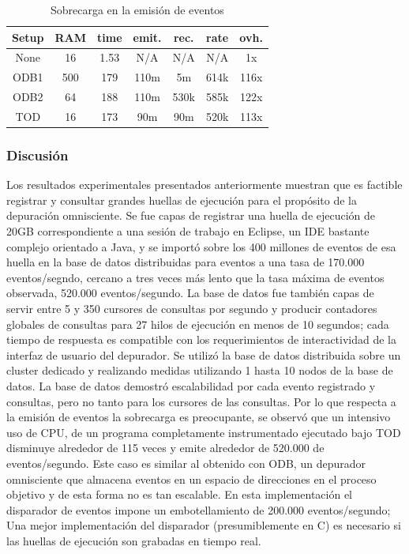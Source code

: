\documentclass[12pt,legalpaper]{report}
\begin{document}
\begin{table}[!h]
\begin{center}
\begin{tabular}{| c | c | c | c | c | c | c |}
\hline
\rowcolor[gray]{0.9}Setup & RAM & time & emit. & rec. & rate & ovh.\\
\hline
None & 16 & 1.53 & N/A & N/A & N/A & 1x\\
\hline
ODB1 & 500 & 179 & 110m & 5m & 614k & 116x\\
\hline
ODB2 & 64 & 188 & 110m & 530k & 585k & 122x\\
\hline
TOD & 16 & 173 & 90m & 90m & 520k & 113x\\
\hline
\end{tabular}
\caption{Sobrecarga en la emisión de eventos}
\label{overheadEvents}
\end{center}
\end{table}

			\subsubsection{Discusión}

Los resultados experimentales presentados anteriormente muestran que es factible registrar y consultar grandes huellas de ejecución para el propósito de la depuración omnisciente.  Se fue capas de registrar una huella de ejecución de 20GB correspondiente a una sesión de trabajo en Eclipse, un IDE bastante complejo orientado a Java, y se importó sobre los 400 millones de eventos de esa huella en la base de datos distribuidas para eventos a una tasa de 170.000 eventos/segndo, cercano a tres veces más lento que la tasa máxima de eventos observada, 520.000 eventos/segundo.  La base de datos fue también capas de servir entre 5 y 350 cursores de consultas por segundo y producir contadores globales de consultas para 27 hilos de ejecución en menos de 10 segundos; cada tiempo de respuesta es compatible con los requerimientos de interactividad de la interfaz de usuario del depurador.  Se utilizó la base de datos distribuida sobre un cluster dedicado y realizando medidas utilizando 1 hasta 10 nodos de la base de datos.  La base de datos demostró escalabilidad por cada evento registrado y consultas, pero no tanto para los cursores de las consultas. Por lo que respecta a la emisión de eventos la sobrecarga es preocupante, se observó que un intensivo uso de CPU, de un programa completamente instrumentado ejecutado bajo TOD disminuye alrededor de 115 veces y emite alrededor de 520.000 de eventos/segundo.  Este caso es similar al obtenido con ODB, un depurador omnisciente que almacena eventos en un espacio de direcciones en el proceso objetivo y de esta forma no es tan escalable.  En esta implementación el disparador de eventos impone un embotellamiento de 200.000 eventos/segundo; Una mejor implementación del disparador (presumiblemente en C) es necesario si las huellas de ejecución son grabadas en tiempo real.
\end{document}
